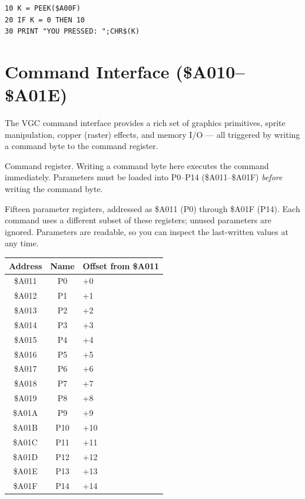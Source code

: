 \begin{lstlisting}
10 K = PEEK($A00F)
20 IF K = 0 THEN 10
30 PRINT "YOU PRESSED: ";CHR$(K)
\end{lstlisting}


\section{Command Interface (\$A010--\$A01E)}
\label{sec:vgc-cmd}

The VGC command interface provides a rich set of graphics primitives, sprite
manipulation, copper (raster) effects, and memory I/O --- all triggered by
writing a command byte to the command register.



Command register.  Writing a command byte here executes the command
immediately.  Parameters must be loaded into P0--P14 (\$A011--\$A01F)
\emph{before} writing the command byte.



Fifteen parameter registers, addressed as \$A011 (P0) through \$A01F (P14).
Each command uses a different subset of these registers; unused parameters are
ignored.  Parameters are readable, so you can inspect the last-written values
at any time.

\begin{center}
\small
\begin{tabular}{@{}ccl@{}}
\toprule
\textbf{Address} & \textbf{Name} & \textbf{Offset from \$A011} \\
\midrule
\$A011 & P0  & +0 \\
\$A012 & P1  & +1 \\
\$A013 & P2  & +2 \\
\$A014 & P3  & +3 \\
\$A015 & P4  & +4 \\
\$A016 & P5  & +5 \\
\$A017 & P6  & +6 \\
\$A018 & P7  & +7 \\
\$A019 & P8  & +8 \\
\$A01A & P9  & +9 \\
\$A01B & P10 & +10 \\
\$A01C & P11 & +11 \\
\$A01D & P12 & +12 \\
\$A01E & P13 & +13 \\
\$A01F & P14 & +14 \\
\bottomrule
\end{tabular}
\end{center}

